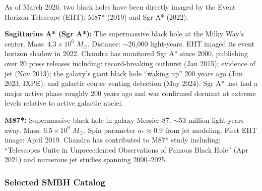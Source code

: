 \documentclass[11pt,letterpaper]{article}
\begin{document}
As of March 2026, two black holes have been directly imaged by the Event Horizon Telescope (EHT): M87* (2019) and Sgr A* (2022).

\textbf{Sagittarius A* (Sgr A*):} The supermassive black hole at the Milky Way's center. Mass: $4.3 \times 10^6$ $M_\odot$. Distance: $\sim$26,000 light-years. EHT imaged its event horizon shadow in 2022. Chandra has monitored Sgr A* since 2000, publishing over 20 press releases including: record-breaking outburst (Jan 2015); evidence of jet (Nov 2013); the galaxy's giant black hole ``waking up'' 200 years ago (Jun 2023, IXPE); and galactic center venting detection (May 2024). Sgr A* last had a major active phase roughly 200 years ago and was confirmed dormant at extreme levels relative to active galactic nuclei.

\textbf{M87*:} Supermassive black hole in galaxy Messier 87, $\sim$53 million light-years away. Mass: $6.5 \times 10^9$ $M_\odot$. Spin parameter $a_* \approx 0.9$ from jet modeling. First EHT image: April 2019. Chandra has contributed to M87* study including: ``Telescopes Unite in Unprecedented Observations of Famous Black Hole'' (Apr 2021) and numerous jet studies spanning 2000--2025.

\subsubsection{Selected SMBH Catalog}
\end{document}
